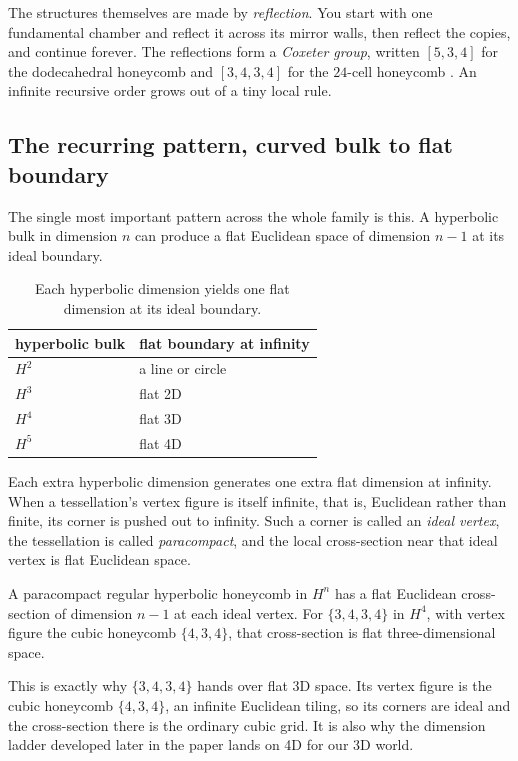 The structures themselves are made by \emph{reflection}. You start with one fundamental chamber and reflect it across its mirror walls, then reflect the copies, and continue forever. The reflections form a \emph{Coxeter group}, written $[5,3,4]$ for the dodecahedral honeycomb and $[3,4,3,4]$ for the $24$-cell honeycomb \cite{coxeter1973}. An infinite recursive order grows out of a tiny local rule.

\subsection{The recurring pattern, curved bulk to flat boundary}

The single most important pattern across the whole family is this. A hyperbolic bulk in dimension $n$ can produce a flat Euclidean space of dimension $n-1$ at its ideal boundary.

\begin{table}[ht]
\centering
\begin{tabular}{@{}ll@{}}
\toprule
hyperbolic bulk & flat boundary at infinity \\
\midrule
$H^2$ & a line or circle \\
$H^3$ & flat 2D \\
$H^4$ & flat 3D \\
$H^5$ & flat 4D \\
\bottomrule
\end{tabular}
\caption{Each hyperbolic dimension yields one flat dimension at its ideal boundary.}
\end{table}

Each extra hyperbolic dimension generates one extra flat dimension at infinity. When a tessellation's vertex figure is itself infinite, that is, Euclidean rather than finite, its corner is pushed out to infinity. Such a corner is called an \emph{ideal vertex}, the tessellation is called \emph{paracompact}, and the local cross-section near that ideal vertex is flat Euclidean space.

\begin{result}
A paracompact regular hyperbolic honeycomb in $H^n$ has a flat Euclidean cross-section of dimension $n-1$ at each ideal vertex. For $\{3,4,3,4\}$ in $H^4$, with vertex figure the cubic honeycomb $\{4,3,4\}$, that cross-section is flat three-dimensional space.
\end{result}

This is exactly why $\{3,4,3,4\}$ hands over flat 3D space. Its vertex figure is the cubic honeycomb $\{4,3,4\}$, an infinite Euclidean tiling, so its corners are ideal and the cross-section there is the ordinary cubic grid. It is also why the dimension ladder developed later in the paper lands on 4D for our 3D world.


